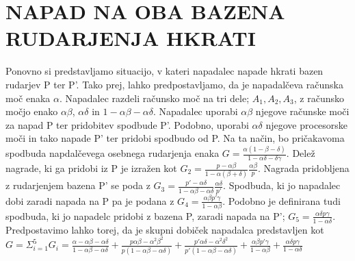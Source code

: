 \documentclass{acm_proc_article-sp}
\begin{document}
\section{NAPAD NA OBA BAZENA RUDARJENJA HKRATI} \label{sekcija5}
Ponovno si predstavljamo situacijo, v kateri napadalec napade hkrati bazen rudarjev P ter P'. Tako prej, lahko predpostavljamo, da je napadalčeva računska moč enaka $\alpha$. Napadalec razdeli računsko moč na tri dele; $A_1, A_2, A_3$, z računsko močjo enako $\alpha\beta$, $\alpha\delta$ in $1 - \alpha\beta - \alpha\delta$. Napadalec uporabi $\alpha\beta$ njegove računske moči za napad P ter pridobitev spodbude P'. Podobno, uporabi $\alpha\delta$ njegove procesorske moči in tako napade P' ter pridobi spodbudo od P. Na ta način, bo pričakavoma spodbuda napdalčevega osebnega rudarjenja enaka $ G = \frac{\alpha(1 - \beta - \delta)}{1 - \alpha\delta - \delta\gamma}$. Delež nagrade, ki ga pridobi iz P je izražen kot $G_2 = \frac{p - \alpha\beta}{1 - \alpha(\beta + \delta)} \frac{\alpha\beta}{p}$. Nagrada pridobljena z rudarjenjem bazena P' se poda z $G_3 = \frac{p' - \alpha\delta}{1 - \alpha\beta - \alpha\delta} \frac{\alpha\delta}{p'}$. Spodbuda, ki jo napadalec dobi zaradi napada na P pa je podana z $G_4 = \frac{\alpha\beta p' \gamma}{1 - \alpha\beta}$. Podobno je definirana tudi spodbuda, ki jo napadelc pridobi z bazena P, zaradi napada na P'; $G_5 = \frac{\alpha\delta p \gamma}{1 - \alpha\delta}$. Predpostavimo lahko torej, da je skupni dobiček napadalca predstavljen kot $G = \Sigma_{i=1}^5 G_i = \frac{\alpha - \alpha\beta - \alpha\delta}{1 - \alpha\beta - \alpha\delta} + \frac{p \alpha\beta - \alpha^2\beta^2}{p(1 - \alpha\beta - \alpha\delta)} + \frac{p' \alpha\delta - \alpha^2\delta^2}{p'(1 - \alpha\beta - \alpha\delta)} + \frac{\alpha\beta p' \gamma}{1 - \alpha\beta} + \frac{\alpha\delta p \gamma}{1 - \alpha\delta}$
\newline
\newline
\end{document}
